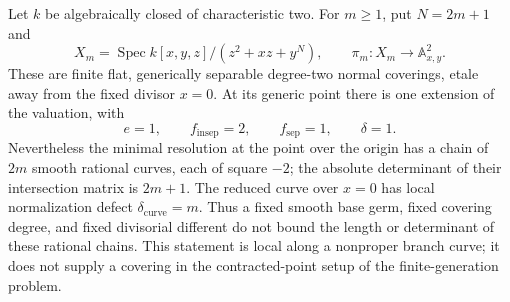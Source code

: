\begin{example}
\label{D:fixed-different-unbounded-rational-chain}
Let \(k\) be algebraically closed of characteristic two. For \(m\geq1\),
put \(N=2m+1\) and
\[
 X_m=\operatorname{Spec}
 k[x,y,z]/(z^2+xz+y^N),\qquad
 \pi_m:X_m\longrightarrow\mathbb A^2_{x,y}.
\]
These are finite flat, generically separable degree-two normal
coverings, etale away from the fixed divisor \(x=0\).
At its generic point there is one extension of the valuation, with
\[
 e=1,\qquad f_{\mathrm{insep}}=2,\qquad
 f_{\mathrm{sep}}=1,\qquad \delta=1.
 \tag{R1}
\]
Nevertheless the minimal resolution at the point over the origin
has a chain of \(2m\) smooth rational curves, each of square \(-2\);
the absolute determinant of their intersection matrix is \(2m+1\).
The reduced curve over \(x=0\) has local normalization defect
\(\delta_{\mathrm{curve}}=m\).
Thus a fixed smooth base germ, fixed covering degree, and fixed
divisorial different do not bound the length or determinant of
these rational chains. This statement is local along a nonproper
branch curve; it does not supply a covering in the contracted-point
setup of the finite-generation problem.
\end{example}

